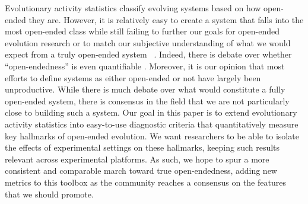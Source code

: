 \documentclass[letterpaper]{article}
\begin{document}
Evolutionary activity statistics classify evolving systems based on how open-ended they are. However, it is relatively easy to create a system that falls into the most open-ended class while still failing to further our goals for open-ended evolution research or to match our subjective understanding of what we would expect from a truly open-ended system ~\cite{maley_four_1999}. Indeed, there is debate over whether ``open-endedness'' is even quantifiable \citep{stanley_role_2016}. Moreover, it is our opinion that most efforts to define systems as either open-ended or not have largely been unproductive. While there is much debate over what would constitute a fully open-ended system, there is consensus in the field that we are not particularly close to building such a system. 
Our goal in this paper is to extend evolutionary activity statistics into easy-to-use diagnostic criteria that
quantitatively measure key hallmarks of open-ended evolution.  We want researchers to be able to isolate the effects of experimental settings on these hallmarks, keeping such results relevant across experimental platforms. As such, we hope to spur a more consistent and comparable march toward true open-endedness, adding new metrics to this toolbox as the community reaches a consensus on the features that we should promote.


\end{document}
